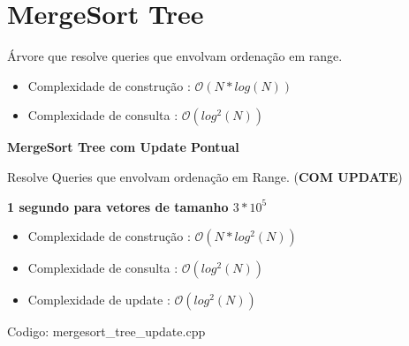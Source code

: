 \documentclass[10pt, a4paper, oneside]{book}
\begin{document}
\section{MergeSort Tree}


Árvore que resolve queries que envolvam ordenação em range.



\begin{itemize}
\item Complexidade de construção : $\mathcal{O}(N * log(N))$
\item Complexidade de consulta : $\mathcal{O}(log^2(N))$
\end{itemize}



\textbf{MergeSort Tree com Update Pontual} 



Resolve Queries que envolvam ordenação em Range. (\textbf{COM UPDATE})  

\textbf{1 segundo para vetores de tamanho $3 * 10^5$}



\begin{itemize}
\item Complexidade de construção : $\mathcal{O}(N * log^2(N))$
\item Complexidade de consulta : $\mathcal{O}(log^2(N))$
\item Complexidade de update : $\mathcal{O}(log^2(N))$
\end{itemize}

\hfill

Codigo: mergesort\_tree\_update.cpp
\end{document}
